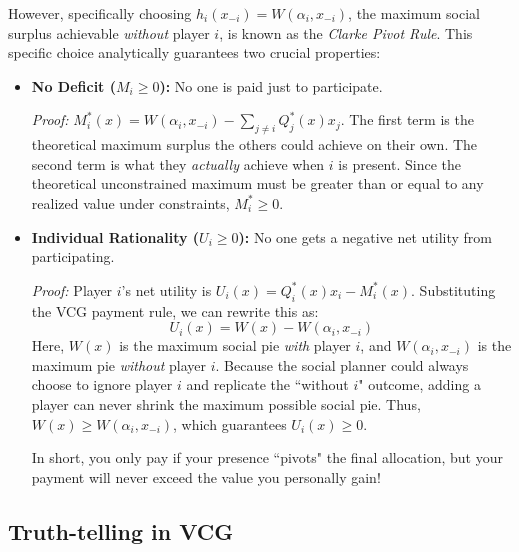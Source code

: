 {\begin{itemize}
  However, specifically choosing $h_i(x_{-i}) = W(\alpha_i, x_{-i})$, the maximum social surplus achievable \textit{without} player $i$, is known as the \textit{Clarke Pivot Rule}. This specific choice analytically guarantees two crucial properties:
  \begin{itemize}
    \item \textbf{No Deficit ($M_i \ge 0$):} No one is paid just to participate.

    \textit{Proof:} $M_i^*(x) = W(\alpha_i, x_{-i}) - \sum_{j\neq i} Q_j^*(x)x_j$. The first term is the theoretical maximum surplus the others could achieve on their own. The second term is what they \textit{actually} achieve when $i$ is present. Since the theoretical unconstrained maximum must be greater than or equal to any realized value under constraints, $M_i^* \ge 0$.

    \item \textbf{Individual Rationality ($U_i \ge 0$):} No one gets a negative net utility from participating.

    \textit{Proof:} Player $i$'s net utility is $U_i(x) = Q_i^*(x)x_i - M_i^*(x)$. Substituting the VCG payment rule, we can rewrite this as:
    \[
    U_i(x) = W(x) - W(\alpha_i, x_{-i})
    \]
    Here, $W(x)$ is the maximum social pie \textit{with} player $i$, and $W(\alpha_i, x_{-i})$ is the maximum pie \textit{without} player $i$. Because the social planner could always choose to ignore player $i$ and replicate the ``without $i$" outcome, adding a player can never shrink the maximum possible social pie. Thus, $W(x) \ge W(\alpha_i, x_{-i})$, which guarantees $U_i(x) \ge 0$.

    In short, you only pay if your presence ``pivots" the final allocation, but your payment will never exceed the value you personally gain!
  \end{itemize}
\end{itemize}
}

\subsection{Truth-telling in VCG}

